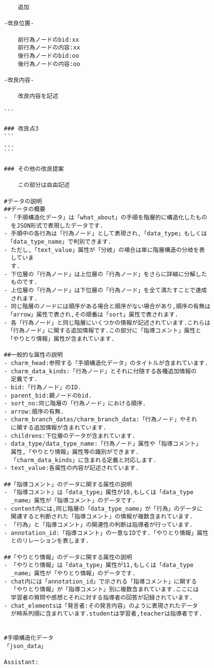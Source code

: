 \begin{tcolorbox}[breakable, colback=white, colframe=black]
\begin{verbatim}
    追加

-改良位置-

    前行為ノードのbid:xx
    前行為ノードの内容:xx
    後行為ノードのbid:oo
    後行為ノードの内容:oo

-改良内容-

    改良内容を記述

```

### 改良点3
```
...
```

### その他の改良提案

    この部分は自由記述

#データの説明
##データの概要
- 「手順構造化データ」は「what_about」の手順を階層的に構造化したもの
  をJSON形式で表現したデータです.
- 手順中の各行為は「行為ノード」として表現され,「data_type」もしくは
 「data_type_name」で判別できます.
- ただし,「text_value」属性が「分岐」の場合は単に階層構造の分岐を表
  していま
  す.
- 下位層の「行為ノード」は上位層の「行為ノード」をさらに詳細に分解した
  ものです.
- 上位層の「行為ノード」は下位層の「行為ノード」を全て満たすことで達成
  されます.
- 同じ階層のノードには順序がある場合と順序がない場合があり,順序の有無は
 「arrow」属性で表され,その順番は「sort」属性で表されます.
- 各「行為ノード」と同じ階層にいくつかの情報が記述されています.これらは
 「行為ノード」に関する追加情報です.この部分に「指導コメント」属性と
 「やりとり情報」属性が含まれています.

##一般的な属性の説明
- charm_head:参照する「手順構造化データ」のタイトルが含まれています.
- charm_data_kinds:「行為ノード」とそれに付随する各種追加情報の
  定義です.
- bid:「行為ノード」のID.
- parent_bid:親ノードのbid.
- sort_no:同じ階層の「行為ノード」における順序.
- arrow:順序の有無.
- charm_branch_datas/charm_branch_data:「行為ノード」やそれ
  に関する追加情報が含まれています.
- childrens:下位層のデータが含まれています.
- data_type/data_type_name:「行為ノード」属性や「指導コメント」
  属性,「やりとり情報」属性等の識別ができます.
  「charm_data_kinds」に含まれる定義と対応します.
- text_value:各属性の内容が記述されています.

##「指導コメント」のデータに関する属性の説明
- 「指導コメント」は「data_type」属性が10,もしくは「data_type
  _name」属性が「指導コメント」のデータです.
- content内には,同じ階層の「data_type_name」が「行為」のデータに
  関連すると判断された「指導コメント」の情報が複数含まれています.
- 「行為」と「指導コメント」の関連性の判断は指導者が行っています.
- annotation_id:「指導コメント」の一意なIDです.「やりとり情報」属性
  とのリレーションを表します.

##「やりとり情報」のデータに関する属性の説明
- 「やりとり情報」は「data_type」属性が11,もしくは「data_type
  _name」属性が「やりとり情報」のデータです.
- chat内には「annotation_id」で示される「指導コメント」に関する
  「やりとり情報」が「指導コメント」別に複数含まれています.ここには
  学習者の質問や感想とそれに対する指導者の回答が記録されています.
- chat_elementsは「発言者:その発言内容」のように表現されたデータ
  が時系列順に含まれています.studentは学習者,teacherは指導者です.


#手順構造化データ
「json_data」

Assistant:
    \end{verbatim}
\end{tcolorbox}